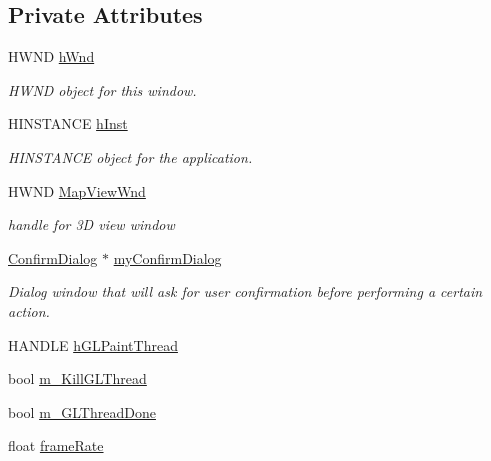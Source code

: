\subsection*{Private Attributes}
\begin{DoxyCompactItemize}
\item 
\hypertarget{class_three_d_viewer_ae7122f9f106f58afc902c77c89cf97c4}{
HWND \hyperlink{class_three_d_viewer_ae7122f9f106f58afc902c77c89cf97c4}{hWnd}}
\label{class_three_d_viewer_ae7122f9f106f58afc902c77c89cf97c4}

\begin{DoxyCompactList}\small\item\em HWND object for this window. \end{DoxyCompactList}\item 
\hypertarget{class_three_d_viewer_a020f59746430cc3a73979c2618c51a4d}{
HINSTANCE \hyperlink{class_three_d_viewer_a020f59746430cc3a73979c2618c51a4d}{hInst}}
\label{class_three_d_viewer_a020f59746430cc3a73979c2618c51a4d}

\begin{DoxyCompactList}\small\item\em HINSTANCE object for the application. \end{DoxyCompactList}\item 
\hypertarget{class_three_d_viewer_a021c6b1049ff46f8a880f58242e32ba1}{
HWND \hyperlink{class_three_d_viewer_a021c6b1049ff46f8a880f58242e32ba1}{MapViewWnd}}
\label{class_three_d_viewer_a021c6b1049ff46f8a880f58242e32ba1}

\begin{DoxyCompactList}\small\item\em handle for 3D view window \end{DoxyCompactList}\item 
\hypertarget{class_three_d_viewer_aebea18b45f3e32e143c49b3cfd7030aa}{
\hyperlink{class_confirm_dialog}{ConfirmDialog} $\ast$ \hyperlink{class_three_d_viewer_aebea18b45f3e32e143c49b3cfd7030aa}{myConfirmDialog}}
\label{class_three_d_viewer_aebea18b45f3e32e143c49b3cfd7030aa}

\begin{DoxyCompactList}\small\item\em Dialog window that will ask for user confirmation before performing a certain action. \end{DoxyCompactList}\item 
HANDLE \hyperlink{class_three_d_viewer_a0c47ff296f00914b1ff504ddea150223}{hGLPaintThread}
\item 
bool \hyperlink{class_three_d_viewer_a9e2ec7fef411ee9ba4dbbcbf3b2a5527}{m\_\-KillGLThread}
\item 
bool \hyperlink{class_three_d_viewer_ae3ba229fd72da44162660aa3d1bd4d02}{m\_\-GLThreadDone}
\item 
\hypertarget{class_three_d_viewer_ac9825e63d5c31167b31a1c7db1328319}{
float \hyperlink{class_three_d_viewer_ac9825e63d5c31167b31a1c7db1328319}{frameRate}}
\label{class_three_d_viewer_ac9825e63d5c31167b31a1c7db1328319}


\end{DoxyCompactItemize}

